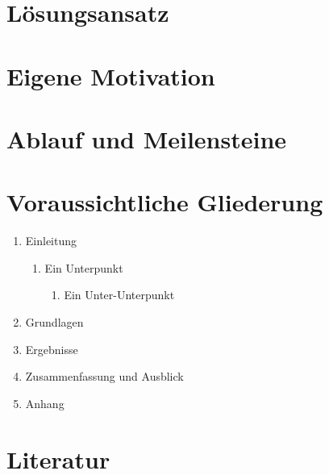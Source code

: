 \documentclass[a4paper,oneside,11pt]{article}
\begin{document}
\section{L\"osungsansatz}


\section{Eigene Motivation}


\section{Ablauf und Meilensteine}


\section{Voraussichtliche Gliederung}

\begin{enumerate}
\item Einleitung
	\begin{enumerate}
	\item Ein Unterpunkt
		\begin{enumerate}
		\item Ein Unter-Unterpunkt
		\end{enumerate}
	\end{enumerate}

\item Grundlagen
\item Ergebnisse
\item Zusammenfassung und Ausblick
\item Anhang

\end{enumerate}

\section*{Literatur}
\end{document}
